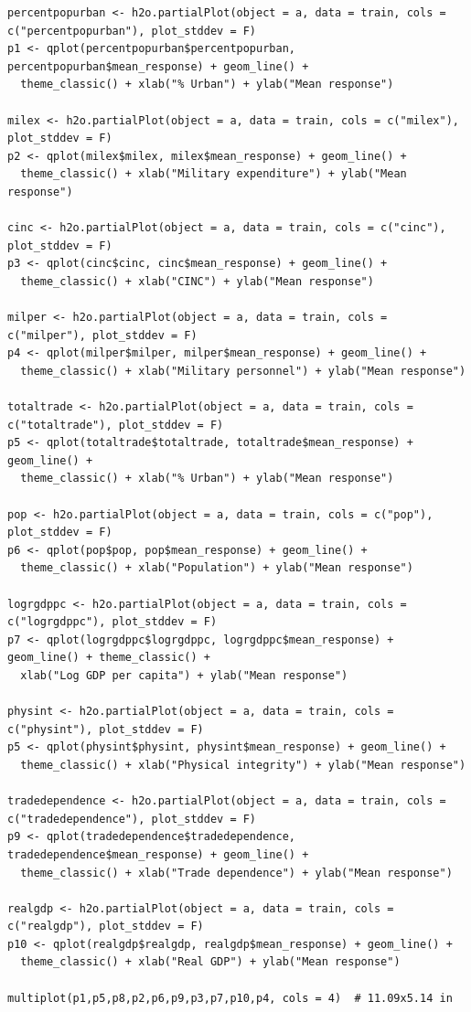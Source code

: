 \documentclass[a4paper,12pt]{article}
\begin{document}
\begin{verbatim}
percentpopurban <- h2o.partialPlot(object = a, data = train, cols = c("percentpopurban"), plot_stddev = F)
p1 <- qplot(percentpopurban$percentpopurban, percentpopurban$mean_response) + geom_line() +
  theme_classic() + xlab("% Urban") + ylab("Mean response")

milex <- h2o.partialPlot(object = a, data = train, cols = c("milex"), plot_stddev = F)
p2 <- qplot(milex$milex, milex$mean_response) + geom_line() +
  theme_classic() + xlab("Military expenditure") + ylab("Mean response")

cinc <- h2o.partialPlot(object = a, data = train, cols = c("cinc"), plot_stddev = F)
p3 <- qplot(cinc$cinc, cinc$mean_response) + geom_line() +
  theme_classic() + xlab("CINC") + ylab("Mean response")

milper <- h2o.partialPlot(object = a, data = train, cols = c("milper"), plot_stddev = F)
p4 <- qplot(milper$milper, milper$mean_response) + geom_line() +
  theme_classic() + xlab("Military personnel") + ylab("Mean response")

totaltrade <- h2o.partialPlot(object = a, data = train, cols = c("totaltrade"), plot_stddev = F)
p5 <- qplot(totaltrade$totaltrade, totaltrade$mean_response) + geom_line() +
  theme_classic() + xlab("% Urban") + ylab("Mean response")

pop <- h2o.partialPlot(object = a, data = train, cols = c("pop"), plot_stddev = F)
p6 <- qplot(pop$pop, pop$mean_response) + geom_line() +
  theme_classic() + xlab("Population") + ylab("Mean response")

logrgdppc <- h2o.partialPlot(object = a, data = train, cols = c("logrgdppc"), plot_stddev = F)
p7 <- qplot(logrgdppc$logrgdppc, logrgdppc$mean_response) + geom_line() + theme_classic() +
  xlab("Log GDP per capita") + ylab("Mean response")

physint <- h2o.partialPlot(object = a, data = train, cols = c("physint"), plot_stddev = F)
p5 <- qplot(physint$physint, physint$mean_response) + geom_line() +
  theme_classic() + xlab("Physical integrity") + ylab("Mean response")

tradedependence <- h2o.partialPlot(object = a, data = train, cols = c("tradedependence"), plot_stddev = F)
p9 <- qplot(tradedependence$tradedependence, tradedependence$mean_response) + geom_line() +
  theme_classic() + xlab("Trade dependence") + ylab("Mean response")

realgdp <- h2o.partialPlot(object = a, data = train, cols = c("realgdp"), plot_stddev = F)
p10 <- qplot(realgdp$realgdp, realgdp$mean_response) + geom_line() +
  theme_classic() + xlab("Real GDP") + ylab("Mean response")

multiplot(p1,p5,p8,p2,p6,p9,p3,p7,p10,p4, cols = 4)  # 11.09x5.14 in
\end{verbatim}

\normalsize

\newpage	


\end{document}
